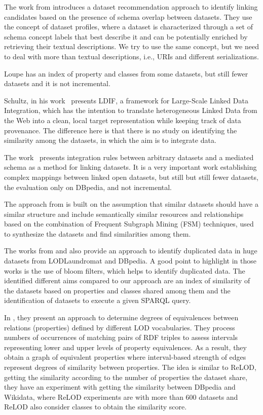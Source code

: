 \documentclass[sw]{iosart2x}
\begin{document}
The work from\cite{ellefi2016dataset} introduces a dataset recommendation approach to identify linking candidates based on the presence of schema overlap between datasets. They use the concept of dataset profiles, where a dataset is characterized through a set of schema concept labels that best describe it and can be potentially enriched by retrieving their textual descriptions. We try to use the same concept, but we need to deal with more than textual descriptions, i.e., URIs and different serializations.

Loupe \cite{mihindukulasooriya2016two} has an index of property and classes from some datasets, but still fewer datasets and it is not incremental. 

Schultz, in his work~\cite{www12schultz} presents LDIF, a framework for Large-Scale Linked Data Integration, which has the intention to translate heterogeneous Linked Data from the Web into a clean, local target representation while keeping track of data provenance.
The difference here is that there is no study on identifying the similarity among the datasets, in which the aim is to integrate data.

The work~\cite{rouces2016complex} presents integration rules between arbitrary datasets and a mediated schema as a method for linking datasets.
It is a very important work establishing complex mappings between linked open datasets, but still but still fewer datasets, the evaluation only on DBpedia, and not incremental.

The approach from \cite{emaldi2015detection} is built on the assumption that similar datasets should have a similar structure and include semantically similar resources and relationships based on the combination of Frequent Subgraph Mining (FSM) techniques, used to synthesize the datasets and find similarities among them.

The works from \cite{baron-2016-ldow-assessing-links} and \cite{BaronKKPEH2017IDOL} also provide an approach to identify duplicated data in huge datasets from LODLaundromat and DBpedia.
A good point to highlight in those works is the use of bloom filters, which helps to identify duplicated data.
The identified different aims compared to our approach are an index of similarity of the datasets based on properties and classes shared among them and the identification of datasets to execute a given SPARQL query.

In \cite{to2017linked}, they present an approach to determine degrees of equivalences between relations (properties) defined by different LOD vocabularies.
They process numbers of occurrences of matching pairs of RDF triples to assess intervals representing lower and upper levels of property equivalences.
As a result, they obtain a graph of equivalent properties where interval-based strength of edges represent degrees of similarity between properties.
The idea is similar to ReLOD, getting the similarity according to the number of properties the dataset share, they have an experiment with getting the similarity between DBpedia and Wikidata, where ReLOD experiments are with more than 600 datasets and ReLOD also consider classes to obtain the similarity score.
\end{document}
